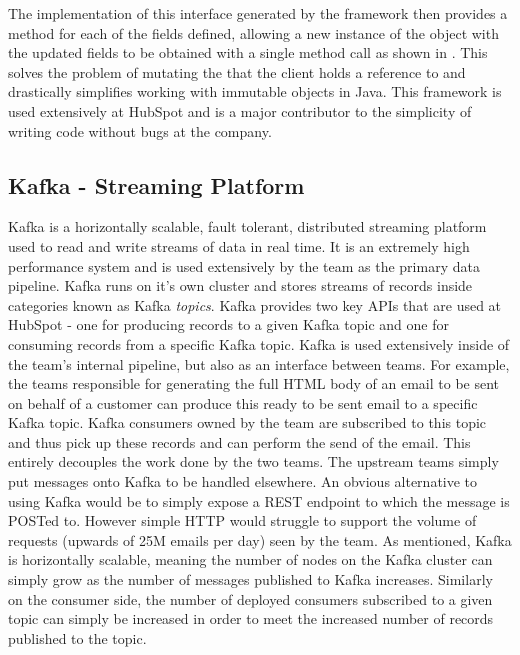 

The implementation of this interface generated by the framework then provides a  method for each of the fields defined, allowing a new instance of the object with the updated fields to be obtained with a single method call as shown in . This solves the problem of mutating the  that the client holds a reference to and drastically simplifies working with immutable objects in Java. This framework is used extensively at HubSpot and is a major contributor to the simplicity of writing code without bugs at the company.




\subsection{Kafka - Streaming Platform}\label{sec:kafka}
Kafka \cite{kafka} is a horizontally scalable, fault tolerant, distributed streaming platform used to read and write streams of data in real time. It is an extremely high performance system and is used extensively by the \team{} team as the primary data pipeline. Kafka runs on it's own cluster and stores streams of records inside categories known as Kafka \textit{topics}. Kafka provides two key APIs that are used at HubSpot - one for producing records to a given Kafka topic and one for consuming records from a specific Kafka topic. Kafka is used extensively inside of the team's internal pipeline, but also as an interface between teams. For example, the teams responsible for generating the full HTML body of an email to be sent on behalf of a customer can produce this ready to be sent email to a specific Kafka topic. Kafka consumers owned by the \team{} team are subscribed to this topic and thus pick up these records and can perform the send of the email. This entirely decouples the work done by the two teams. The upstream teams simply put messages onto Kafka to be handled elsewhere. An obvious alternative to using Kafka would be to simply expose a REST endpoint to which the message is POSTed to. However simple HTTP would struggle to support the volume of requests (upwards of 25M emails per day) seen by the \team{} team. As mentioned, Kafka is horizontally scalable, meaning the number of nodes on the Kafka cluster can simply grow as the number of messages published to Kafka increases. Similarly on the consumer side, the number of deployed consumers subscribed to a given topic can simply be increased in order to meet the increased number of records published to the topic.


